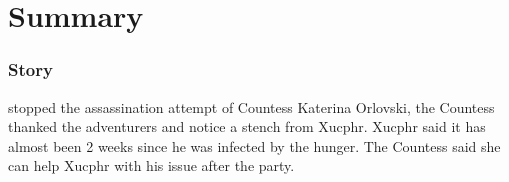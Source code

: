 \part*{Summary}
\section{Story}
 stopped the assassination attempt of Countess Katerina Orlovski, the Countess thanked the adventurers and notice a stench from Xucphr. Xucphr said it has almost been 2 weeks since he was infected by the hunger. The Countess said she can help Xucphr with his issue after the party.

